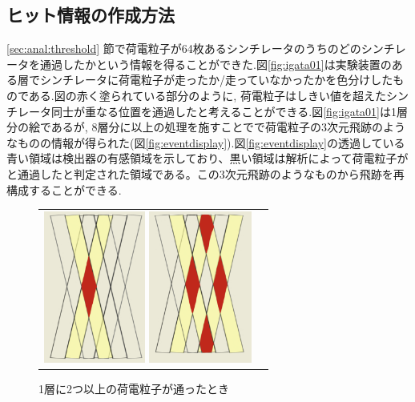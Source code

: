 \subsection{ヒット情報の作成方法}\label{subsec:anal:make_hit}
\ref{sec:anal:threshold} 節で荷電粒子が64枚あるシンチレータのうちのどのシンチレータを通過したかという情報を得ることができた.図\ref{fig:igata01}は実験装置のある層でシンチレータに荷電粒子が走ったか/走っていなかったかを色分けしたものである.図の赤く塗られている部分のように, 荷電粒子はしきい値を超えたシンチレータ同士が重なる位置を通過したと考えることができる.図\ref{fig:igata01}は1層分の絵であるが, 8層分に以上の処理を施すことでで荷電粒子の3次元飛跡のようなものの情報が得られた(図\ref{fig:eventdisplay}).図\ref{fig:eventdisplay}の透過している青い領域は検出器の有感領域を示しており、黒い領域は解析によって荷電粒子がと通過したと判定された領域である。この3次元飛跡のようなものから飛跡を再構成することができる.
\begin{figure}[H]
    \begin{tabular}{cc}
        \begin{minipage}[t]{0.45\hsize}
            \centering
            \includegraphics[height=5.0cm]{img/igata_01.png}
            \caption{1層分のシンチレータ}
            \label{fig:igata01}
        \end{minipage}
        \begin{minipage}[t]{0.45\hsize}
            \centering
            \includegraphics[height=5.0cm]{img/igata_02.png}
            \caption{1層に2つ以上の荷電粒子が通ったとき}
            \label{fig:igata02}
        \end{minipage}
    \end{tabular}
\end{figure}
